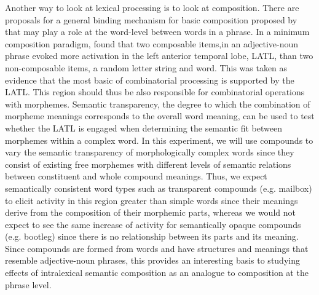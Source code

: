 \documentclass{frontiersSCNS}
\begin{document}
	Another way to look at lexical processing is to look at composition. There are proposals for a general binding mechanism for basic composition proposed by \citet*{Bemis:2011} that may play a role at the word-level between words in a phrase. In a minimum composition paradigm, \citep{Bemis:2011} found that two composable items,in an adjective-noun phrase evoked more activation in the left anterior temporal lobe, LATL, than two non-composable items, a random letter string and word. This was taken as evidence that the most basic of combinatorial processing is supported by the LATL. This region should thus be also responsible for combinatorial operations with morphemes. Semantic transparency, the degree to which the combination of morpheme meanings corresponds to the overall word meaning, can be used to test whether the LATL is engaged when determining the semantic fit between morphemes within a complex word. In this experiment, we will use compounds to vary the semantic transparency of morphologically complex words since they consist of existing free morphemes with different levels of semantic relations between constituent and whole compound meanings. Thus, we expect semantically consistent word types such as transparent compounds (e.g. mailbox) to elicit activity in this region greater than simple words since their meanings derive from the composition of their morphemic parts, whereas we would not expect to see the same increase of activity for semantically opaque compounds (e.g. bootleg) since there is no relationship between its parts and its meaning. Since compounds are formed from words and have structures and meanings that resemble adjective-noun phrases, this provides an interesting basis to studying effects of intralexical semantic composition as an analogue to composition at the phrase level.
\end{document}
